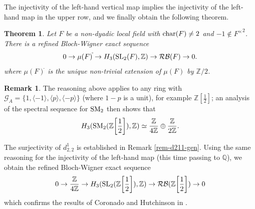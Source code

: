 \documentclass[11pt]{amsart}
\theoremstyle{definition}
\theoremstyle{plain}
\newtheorem{thm}[ntn]{Theorem}
\theoremstyle{definition}
\newtheorem{rem}[ntn]{Remark}
\numberwithin{equation}{section}
\newcommand{\z}{\mathbb{Z}}
\newcommand{\q}{\mathbb{Q}}
\newcommand{\GG}{\mathcal{G}}
\newcommand{\RB}{\mathcal{RB}}
\newcommand{\half}{{\left[\frac{1}{2}\right]}}
\newcommand{\lan}{\langle}
\newcommand{\ran}{\rangle}
\newcommand{\SL}{\mathit{{\rm SL}}}
\newcommand{\SM}{\mathit{{\rm SM}}}
\renewcommand{\char}{{\rm char}}
\begin{document}
	The injectivity of the left-hand vertical map implies the injectivity of the left-hand map in the upper row, and we finally obtain the following theorem.
	\begin{thm}
		Let $F$ be a non-dyadic local field with $\char(F)\neq 2$ and $-1\notin {F^\times}^2$. There is a refined Bloch-Wigner exact sequence
		\[
		0\to\mu(F)^{\tilde{}}\to H_3(\SL_2(F),\z)\to\RB(F)\to 0.
		\]
		where $\mu(F)^{\tilde{}}$ is the unique non-trivial extension of $\mu(F)$ by $\z/2$.
	\end{thm}
	\begin{rem}
		\label{rem-z12}
		The reasoning above applies to any ring with $\GG_A=\{1,\lan-1\ran,\lan p\ran,\lan-p\ran\}$ (where $1-p$ is a unit), for example $\z\half$; an analysis of the spectral sequence for $\SM_2$ then shows that
		\[
		H_3(\SM_2(\z\half),\z)\simeq\frac{\z}{4\z}\oplus\frac{\z}{2\z}.
		\]
		
		The surjectivity of $d^1_{2,2}$ is established in Remark \ref{rem-d211-gen}. Using the same reasoning for the injectivity of the left-hand map (this time passing to $\q$), we obtain the refined Bloch-Wigner exact sequence
		\[
		0\to\frac{\z}{4\z}\to H_3(\SL_2(\z\half),\z)\to\RB(\z\half)\to0
		\]
		which confirms the results of Coronado and Hutchinson in \cite[\S 8]{C-H2022}.
	\end{rem}
\end{document}

